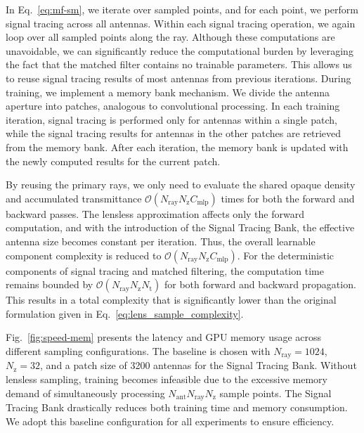In Eq.~\ref{eq:mf-sm}, we iterate over sampled points, and for each point, we perform signal tracing across all antennas.
Within each signal tracing operation, we again loop over all sampled points along the ray.
Although these computations are unavoidable, we can significantly reduce the computational burden by leveraging the fact that the matched filter contains no trainable parameters.
This allows us to reuse signal tracing results of most antennas from previous iterations.
During training, we implement a memory bank mechanism.
We divide the antenna aperture into patches, analogous to convolutional processing.
In each training iteration, signal tracing is performed only for antennas within a single patch, while the signal tracing results for antennas in the other patches are retrieved from the memory bank.
After each iteration, the memory bank is updated with the newly computed results for the current patch.

By reusing the primary rays, we only need to evaluate the shared opaque density and accumulated transmittance \( \mathcal{O}( N_{\text{ray}} N_{\text{z}}C_{\text{mlp}}) \) times for both the forward and backward passes.
The lensless approximation affects only the forward computation, and with the introduction of the Signal Tracing Bank, the effective antenna size becomes constant per iteration.
Thus, the overall learnable component complexity is reduced to \( \mathcal{O}( N_{\text{ray}} N_{\text{z}} C_{\text{mlp}}) \).
For the deterministic components of signal tracing and matched filtering, the computation time remains bounded by \( \mathcal{O}( N_{\text{ray}} N_{\text{z}} N_{\text{t}}) \) for both forward and backward propagation.
This results in a total complexity that is significantly lower than the original formulation given in Eq.~\ref{eq:lens_sample_complexity}.

Fig.~\ref{fig:speed-mem} presents the latency and GPU memory usage across different sampling configurations.
The baseline is chosen with \( N_{\text{ray}} = 1024 \), \( N_{\text{z}} = 32 \), and a patch size of 3200 antennas for the Signal Tracing Bank.
Without lensless sampling, training becomes infeasible due to the excessive memory demand of simultaneously processing \( N_{\text{ant}}  N_{\text{ray}} N_{\text{z}} \) sample points.
The Signal Tracing Bank drastically reduces both training time and memory consumption.
We adopt this baseline configuration for all experiments to ensure efficiency.


